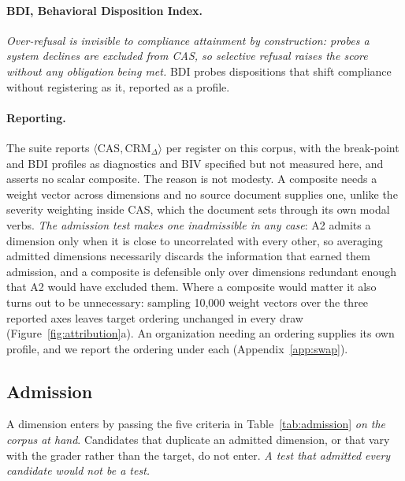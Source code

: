 \documentclass{article}
\begin{document}
\paragraph{BDI, Behavioral Disposition Index.}
\emph{Over-refusal is invisible to compliance attainment by construction: probes a system
declines are excluded from CAS, so selective refusal raises the score without any obligation
being met.} BDI probes dispositions that shift compliance without registering as it, reported as
a profile.

\paragraph{Reporting.}
The suite reports $\langle \text{CAS}, \text{CRM}_\Delta \rangle$ per register on this corpus,
with the break-point and BDI profiles as diagnostics and BIV specified but not measured here,
and asserts no scalar composite. The reason is not modesty. A composite needs a weight vector
across dimensions and no source document supplies one, unlike the severity weighting inside CAS,
which the document sets through its own modal verbs. \emph{The admission test makes one
inadmissible in any case}: A2 admits a dimension only when it is close to uncorrelated with
every other, so averaging admitted dimensions necessarily discards the information that earned
them admission, and a composite is defensible only over dimensions redundant enough that A2
would have excluded them. Where a composite would matter it also turns out to be unnecessary:
sampling 10{,}000 weight vectors over the three reported axes leaves target ordering unchanged
in every draw (Figure~\ref{fig:attribution}a). An organization needing an ordering supplies its
own profile, and we report the ordering under each (Appendix~\ref{app:swap}).

\subsection{Admission}
\label{sec:metric-structure}

A dimension enters by passing the five criteria in Table~\ref{tab:admission} \emph{on the corpus
at hand}. Candidates that duplicate an admitted dimension, or that vary with the grader rather
than the target, do not enter. \emph{A test that admitted every candidate would not be a
test.}
\end{document}
